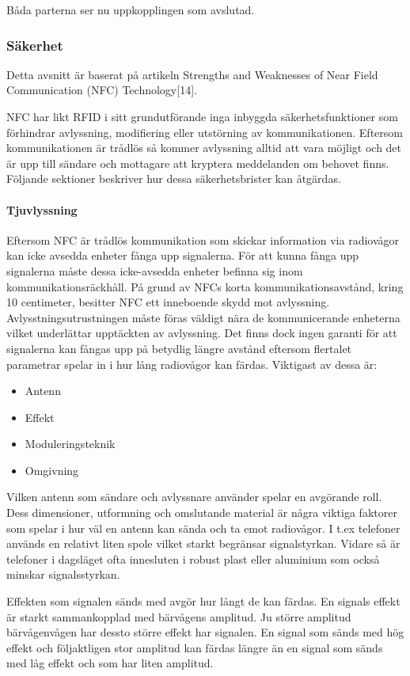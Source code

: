 \documentclass[11pt]{article}
\begin{document}
Båda parterna ser nu uppkopplingen som avslutad.


\subsubsection{Säkerhet}
Detta avsnitt är baserat på artikeln Strengths and Weaknesses of Near Field Communication (NFC) Technology[14].

NFC har likt RFID i sitt grundutförande inga inbyggda säkerhetsfunktioner som förhindrar avlyssning, modifiering eller utstörning av kommunikationen. Eftersom kommunikationen är trådlös så kommer avlyssning alltid att vara möjligt och det är upp till sändare och mottagare att kryptera meddelanden om behovet finns. Följande sektioner beskriver hur dessa säkerhetsbrister kan åtgärdas. 

\paragraph{Tjuvlyssning}
Eftersom NFC är trådlös kommunikation som skickar information via radiovågor kan icke avsedda enheter fånga upp signalerna. För att kunna fånga upp signalerna måste dessa icke-avsedda enheter befinna sig inom kommunikationsräckhåll. På grund av NFCs korta kommunikationsavstånd, kring 10 centimeter, besitter NFC ett inneboende skydd mot avlyssning. Avlysstningsutrustningen måste föras väldigt nära de kommunicerande enheterna vilket underlättar upptäckten av avlyssning. Det finns dock ingen garanti för att signalerna kan fångas upp på betydlig längre avstånd eftersom flertalet parametrar spelar in i hur lång radiovågor kan färdas. Viktigast av dessa är:

\begin{itemize}
\item Antenn
\item Effekt
\item Moduleringsteknik
\item Omgivning
\end{itemize}

Vilken antenn som sändare och avlyssnare använder spelar en avgörande roll. Dess dimensioner, utformning och omslutande material är några viktiga faktorer som spelar i hur väl en antenn kan sända och ta emot radiovågor. I t.ex telefoner används en relativt liten spole vilket starkt begränsar signalstyrkan. Vidare så är telefoner i dagsläget ofta innesluten i robust plast eller aluminium som också minskar signalsstyrkan.

Effekten som signalen sänds med avgör hur långt de kan färdas. En signals effekt är starkt sammankopplad med bärvågens amplitud. Ju större amplitud bärvågenvågen har dessto större effekt har signalen. En signal som sänds med hög effekt och följaktligen stor amplitud kan färdas längre än en signal som sänds med låg effekt och som har liten amplitud. 
\end{document}
